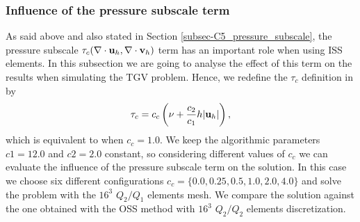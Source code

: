 \subsubsection{Influence of the pressure subscale term}
As said above and also stated in Section \ref{subsec-C5_pressure_subscale}, the pressure subscale $\tau_c(\nabla\cdot{\bf u}_h,\nabla\cdot{\bf v}_h)$ term has an important role when using ISS elements. In this subsection we are going to analyse the effect of this term on the results when simulating the TGV problem. Hence, we redefine the $\tau_c$ definition in  by
\begin{equation}
\label{eq-C5_tau_c_2}
\tau_c=c_c\left(\nu+\frac{c_2}{c_1}h|{\bf u}_h|\right),
\end{equation}
which is equivalent to  when $c_c=1.0$. We keep the algorithmic parameters $c1=12.0$ and $c2=2.0$ constant, so considering different values of $c_c$ we can evaluate the influence of the pressure subscale term on the solution. In this case we choose six different configurations $c_c=\{0.0,0.25,0.5,1.0,2.0,4.0\}$ and solve the problem with the $16^3$ $Q_2/Q_1$ elements mesh. We compare the solution against the one obtained with the OSS method with $16^3$ $Q_2/Q_2$ elements discretization. 

